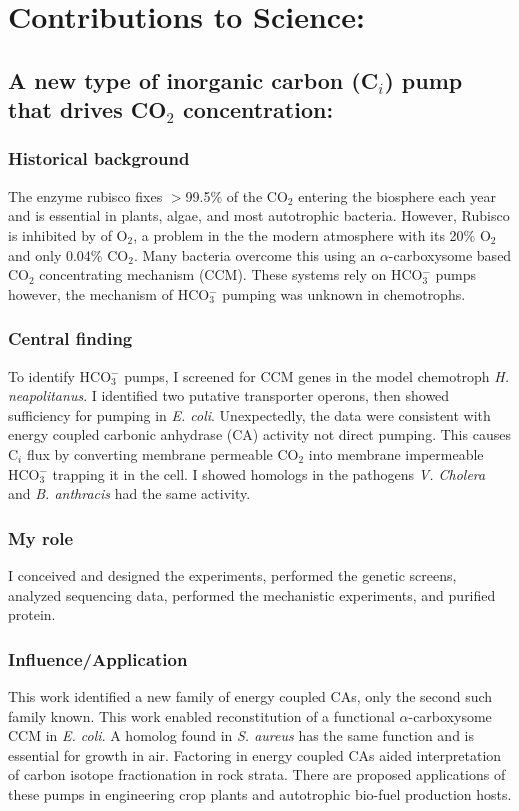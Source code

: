 \documentclass{article}
\begin{document}
\section*{Contributions to Science:}
\newrefsection
\subsection{A new type of inorganic carbon (C$_i$) pump that drives CO$_2$ concentration:}
\subsubsection{Historical background}
The enzyme rubisco fixes $>$99.5\% of the CO$_2$ entering the biosphere each year and is essential in plants, algae, and most autotrophic bacteria. 
However, Rubisco is inhibited by of O$_2$, a problem in the the modern atmosphere with its 20\% O$_2$ and only 0.04\% CO$_2$.
Many bacteria overcome this using an $\alpha$-carboxysome based CO$_2$ concentrating mechanism (CCM).
These systems rely on HCO$_{3}^{-}$ pumps however, the mechanism of HCO$_{3}^{-}$ pumping was unknown in chemotrophs.
%
\subsubsection{Central finding}
To identify HCO$_{3}^{-}$ pumps, I screened for CCM genes in the model chemotroph \textit{H. neapolitanus}.
I identified two putative transporter operons, then showed sufficiency for pumping in \textit{E. coli}. 
Unexpectedly, the data were consistent with energy coupled carbonic anhydrase (CA) activity not direct pumping.
This causes C$_i$ flux by converting membrane permeable CO$_2$ into membrane impermeable HCO$_{3}^{-}$ trapping it in the cell.
I showed homologs in the pathogens \textit{V. Cholera} and \textit{B. anthracis} had the same activity.
%
\subsubsection{My role}
I conceived and designed the experiments, performed the genetic screens, analyzed sequencing data, performed the mechanistic experiments, and purified protein.
%
\subsubsection{Influence/Application}
This work identified a new family of energy coupled CAs, only the second such family known.
This work enabled reconstitution of a functional $\alpha$-carboxysome CCM in \textit{E. coli}. 
A homolog found in \textit{S. aureus} has the same function and is essential for growth in air. 
Factoring in energy coupled CAs aided interpretation of carbon isotope fractionation in rock strata.
There are proposed applications of these pumps in engineering crop plants and autotrophic bio-fuel production hosts.
%
\nocite{Desmarais2019-yc,Desmarais2018-ac,Desmarais2019-dc}
\printbibliography[heading=none]
\end{document}

